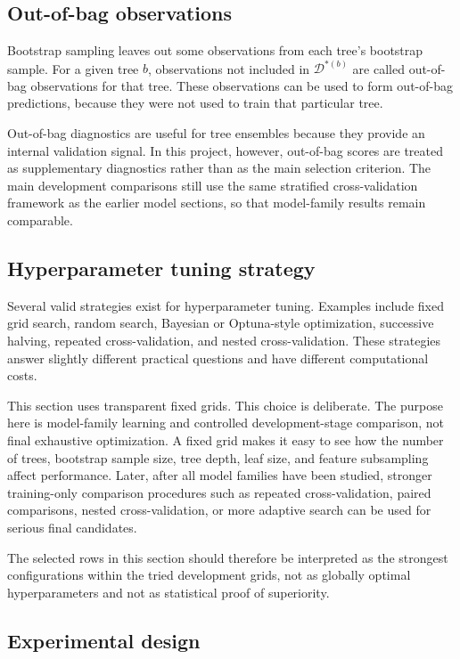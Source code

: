 \subsection{Out-of-bag observations}

Bootstrap sampling leaves out some observations from each tree's bootstrap sample. For a given tree \(b\), observations not included in \(\mathcal{D}^{*(b)}\) are called out-of-bag observations for that tree. These observations can be used to form out-of-bag predictions, because they were not used to train that particular tree.

Out-of-bag diagnostics are useful for tree ensembles because they provide an internal validation signal. In this project, however, out-of-bag scores are treated as supplementary diagnostics rather than as the main selection criterion. The main development comparisons still use the same stratified cross-validation framework as the earlier model sections, so that model-family results remain comparable.

\subsection{Hyperparameter tuning strategy}

Several valid strategies exist for hyperparameter tuning. Examples include fixed grid search, random search, Bayesian or Optuna-style optimization, successive halving, repeated cross-validation, and nested cross-validation. These strategies answer slightly different practical questions and have different computational costs.

This section uses transparent fixed grids. This choice is deliberate. The purpose here is model-family learning and controlled development-stage comparison, not final exhaustive optimization. A fixed grid makes it easy to see how the number of trees, bootstrap sample size, tree depth, leaf size, and feature subsampling affect performance. Later, after all model families have been studied, stronger training-only comparison procedures such as repeated cross-validation, paired comparisons, nested cross-validation, or more adaptive search can be used for serious final candidates.

The selected rows in this section should therefore be interpreted as the strongest configurations within the tried development grids, not as globally optimal hyperparameters and not as statistical proof of superiority.

\subsection{Experimental design}

